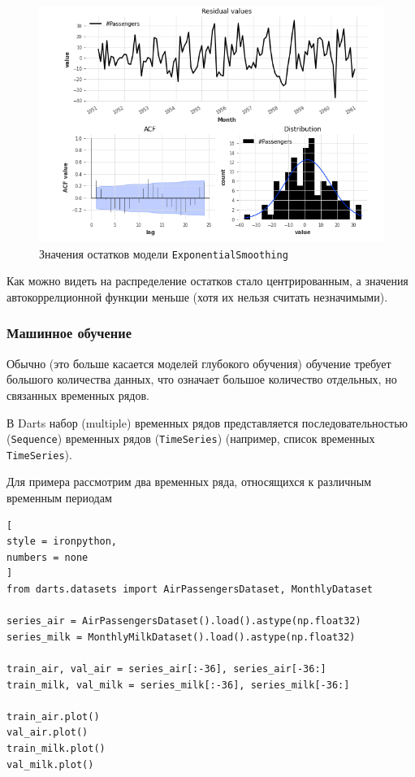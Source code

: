 \documentclass[%
	11pt,
	a4paper,
	utf8,
		]{article}
\begin{document}
\begin{figure}[h]
	\centering
	\includegraphics[scale=1.25]{figures/residuals_darts_es.png}
	\caption{ Значения остатков модели \texttt{ExponentialSmoothing}}\label{fig:residuals_darts_es}
\end{figure}

Как можно видеть на  распределение остатков стало центрированным, а значения автокоррелционной функции меньше (хотя их нельзя считать незначимыми).

\subsubsection{Машинное обучение}

Обычно (это больше касается моделей глубокого обучения) обучение требует большого количества данных, что означает большое количество отдельных, но связанных временных рядов.

В Darts набор (multiple) временных рядов представляется последовательностью (\verb|Sequence|) временных рядов (\verb|TimeSeries|) (например, список временных \verb|TimeSeries|).

Для примера рассмотрим два временных ряда, относящихся к различным временным периодам
\begin{lstlisting}[
style = ironpython,
numbers = none
]
from darts.datasets import AirPassengersDataset, MonthlyDataset

series_air = AirPassengersDataset().load().astype(np.float32)
series_milk = MonthlyMilkDataset().load().astype(np.float32)

train_air, val_air = series_air[:-36], series_air[-36:]
train_milk, val_milk = series_milk[:-36], series_milk[-36:]

train_air.plot()
val_air.plot()
train_milk.plot()
val_milk.plot()
\end{lstlisting}
\end{document}
